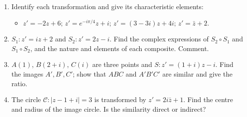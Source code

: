 \documentclass[11pt]{article}
\begin{document}
\begin{exercice}[Assessment]
\begin{enumerate}
\item Identify each transformation and give its characteristic elements:
\begin{itemize}
\item $z' = -2z + 6$; \quad $z' = e^{-i\pi/4} z + i$; \quad $z' = (3 - 3i)z + 4i$; \quad $z' = \bar z + 2$.
\end{itemize}
\item $S_1: z' = iz + 2$ and $S_2: z' = 2z - i$. Find the complex expressions of $S_2 \circ S_1$ and $S_1 \circ S_2$, and the nature and elements of each composite. Comment.
\item $A(1)$, $B(2 + i)$, $C(i)$ are three points and $S: z' = (1 + i)z - i$. Find the images $A', B', C'$; show that $ABC$ and $A'B'C'$ are similar and give the ratio.
\item The circle $\mathcal{C}: |z - 1 + i| = 3$ is transformed by $z' = 2i\bar z + 1$. Find the centre and radius of the image circle. Is the similarity direct or indirect?
\end{enumerate}
\end{exercice}
\end{document}
